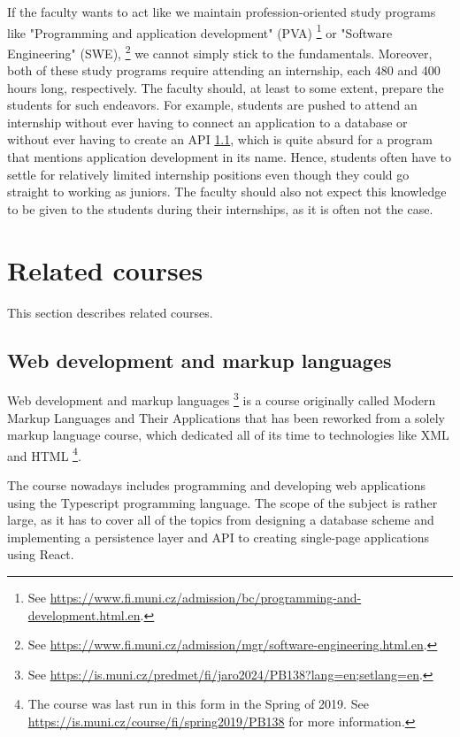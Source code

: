 \documentclass[
  digital,
  color,
  oneside,
  nosansbold,
  nocolorbold,
  lof,
  lot,
]{fithesis4}
\begin{document}
If the faculty wants to act like we maintain profession-oriented study programs like "Programming and application development" (PVA)
\footnote{See \url{https://www.fi.muni.cz/admission/bc/programming-and-development.html.en}.}
or "Software Engineering" (SWE), 
\footnote{See \url{https://www.fi.muni.cz/admission/mgr/software-engineering.html.en}.}
we cannot simply stick to the fundamentals. 
Moreover, both of these study programs require attending an internship, each 480 and 400 hours long, respectively. The faculty should, at least to some extent, prepare the students for such endeavors. For example, students are pushed to attend an internship without ever having to connect an application to a database or without ever having to create an API \ref{web-dev}, which is quite absurd for a program that mentions application development in its name. Hence, students often have to settle for relatively limited internship positions even though they could go straight to working as juniors. The faculty should also not expect this knowledge to be given to the students during their internships, as it is often not the case.

\section{Related courses}

This section describes related courses.

\subsection{Web development and markup languages} \label{web-dev}

Web development and markup languages
\footnote{See \url{https://is.muni.cz/predmet/fi/jaro2024/PB138?lang=en;setlang=en}.}
is a course originally called Modern Markup Languages and Their Applications that has been reworked from a solely markup language course, which dedicated all of its time to technologies like XML and HTML
\footnote{The course was last run in this form in the Spring of 2019. See \url{https://is.muni.cz/course/fi/spring2019/PB138} for more information.}.

The course nowadays includes programming and developing web applications using the Typescript programming language. The scope of the subject is rather large, as it has to cover all of the topics from designing a database scheme and implementing a persistence layer and API to creating single-page applications using React.
\end{document}
